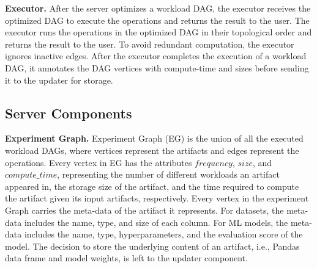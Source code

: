 \textbf{Executor. }
After the server optimizes a workload DAG, the executor receives the optimized DAG to execute the operations and returns the result to the user.
The executor runs the operations in the optimized DAG in their topological order and returns the result to the user.
To avoid redundant computation, the executor ignores inactive edges.
After the executor completes the execution of a workload DAG, it annotates the DAG vertices with compute-time and sizes before sending it to the updater for storage.

%

\subsection{Server Components}
\textbf{Experiment Graph.}
Experiment Graph (EG) is the union of all the executed workload DAGs, where vertices represent the artifacts and edges represent the operations.
Every vertex in EG has the attributes $frequency$, $size$, and $compute\_time$, representing the number of different workloads an artifact appeared in, the storage size of the artifact, and the time required to compute the artifact given its input artifacts, respectively.
Every vertex in the experiment Graph carries the meta-data of the artifact it represents.
For datasets, the meta-data includes the name, type, and size of each column.
For ML models, the meta-data includes the name, type, hyperparameters, and the evaluation score of the model.
The decision to store the underlying content of an artifact, i.e., Pandas data frame and model weights, is left to the updater component.

